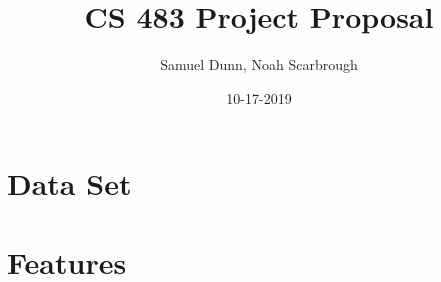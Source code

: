 \documentclass{article}
\title{CS 483 Project Proposal}
\author{Samuel Dunn, Noah Scarbrough}
\date{10-17-2019}
\begin{document}
\maketitle

\section{Data Set}

\section{Features}
\end{document}
